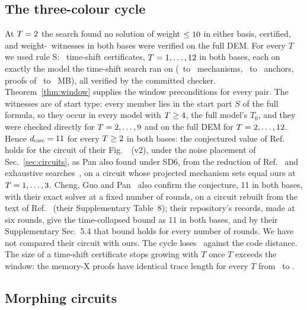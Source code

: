 \documentclass[aps,pra,twocolumn,superscriptaddress,nofootinbib,longbibliography,floatfix]{revtex4-2}
\newcommand{\dc}{d_{\mathrm{circ}}}
\begin{document}
\subsection{The three-colour cycle}

At $T=2$ the search found no solution of weight $\le10$ in either basis, certified, and weight-\TcD\ witnesses in both bases were verified on the full DEM. For every $T$ we used rule S: \TcShiftCerts\ time-shift certificates, $T=1,\dots,12$ in both bases, each on exactly the model the time-shift search ran on (\TcShiftMechLo\ to \TcShiftMechHi\ mechanisms, \TcAnchorsLo\ to \TcAnchorsHi\ anchors, proofs of \TcShiftMBLo\ to \TcShiftMBHi~MB), all verified by the committed checker. Theorem~\ref{thm:window} supplies the window preconditions for every pair. The witnesses are of start type: every member lies in the start part $S$ of the full formula, so they occur in every model with $T\ge4$, the full model's $T_0$, and they were checked directly for $T=2,\dots,9$ and on the full DEM for $T=2,\dots,12$. Hence $\dc=\TcD$ for every $T\ge2$ in both bases: the conjectured value of Ref.~\cite{strikis2026high} holds for the circuit of their Fig.~\SBBFigCycle\ (v2), under the noise placement of Sec.~\ref{sec:circuits}, as Pan also found under SD6, from the reduction of Ref.~\cite{strikis2026high} and exhaustive searches~\cite{pan2026interleaving}, on a circuit whose projected mechanism sets equal ours at $T=1,\dots,3$. Cheng, Guo and Pan~\cite{cheng2026certifying} also confirm the conjecture, 11 in both bases, with their exact solver at a fixed number of rounds, on a circuit rebuilt from the text of Ref.~\cite{strikis2026high} (their Supplementary Table~8); their repository's records, made at six rounds, give the time-collapsed bound as 11 in both bases, and by their Supplementary Sec.~5.4 that bound holds for every number of rounds. We have not compared their circuit with ours. The cycle loses \TcLoss\ against the code distance. The size of a time-shift certificate stops growing with $T$ once $T$ exceeds the window: the memory-X proofs have identical trace length for every $T$ from \TcPlateauFrom\ to \TcShiftThi.

\subsection{Morphing circuits}
\end{document}
